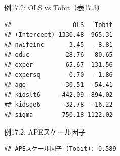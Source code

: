 \documentclass[
  ignorenonframetext,
]{beamer}
\newenvironment{Shaded}{\begin{snugshade}}{\end{snugshade}}
\newcommand{\AttributeTok}[1]{\textcolor[rgb]{0.77,0.63,0.00}{#1}}
\newcommand{\CommentTok}[1]{\textcolor[rgb]{0.56,0.35,0.01}{\textit{#1}}}
\newcommand{\DecValTok}[1]{\textcolor[rgb]{0.00,0.00,0.81}{#1}}
\newcommand{\FunctionTok}[1]{\textcolor[rgb]{0.00,0.00,0.00}{#1}}
\newcommand{\NormalTok}[1]{#1}
\newcommand{\OtherTok}[1]{\textcolor[rgb]{0.56,0.35,0.01}{#1}}
\newcommand{\SpecialCharTok}[1]{\textcolor[rgb]{0.00,0.00,0.00}{#1}}
\newcommand{\StringTok}[1]{\textcolor[rgb]{0.31,0.60,0.02}{#1}}
\begin{document}
\begin{frame}[fragile]{例17.2: OLS vs Tobit（表17.3）}
\protect\hypertarget{ux4f8b17.2-ols-vs-tobitux886817.3}{}
\footnotesize

\begin{Shaded}
\end{Shaded}

\begin{verbatim}
##                 OLS   Tobit
## (Intercept) 1330.48  965.31
## nwifeinc      -3.45   -8.81
## educ          28.76   80.65
## exper         65.67  131.56
## expersq       -0.70   -1.86
## age          -30.51  -54.41
## kidslt6     -442.09 -894.02
## kidsge6      -32.78  -16.22
## sigma        750.18 1122.02
\end{verbatim}

\normalsize
\end{frame}

\begin{frame}[fragile]{例17.2: APEスケール因子}
\protect\hypertarget{ux4f8b17.2-apeux30b9ux30b1ux30fcux30ebux56e0ux5b50}{}
\footnotesize

\begin{Shaded}
\end{Shaded}

\begin{verbatim}
## APEスケール因子 (Tobit): 0.589
\end{verbatim}

\normalsize
\end{frame}
\end{document}
